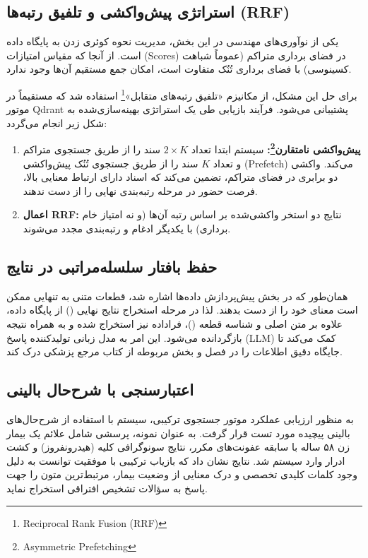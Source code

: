 \subsection{استراتژی پیش‌واکشی و تلفیق رتبه‌ها (RRF)}
یکی از نوآوری‌های مهندسی در این بخش، مدیریت نحوه کوئری زدن به پایگاه داده است. از آنجا که مقیاس امتیازات (Scores) در فضای برداری متراکم (عموماً شباهت کسینوسی) با فضای برداری تُنُک متفاوت است، امکان جمع مستقیم آن‌ها وجود ندارد. 

برای حل این مشکل، از مکانیزم «تلفیق رتبه‌های متقابل»\footnote{Reciprocal Rank Fusion (RRF)} استفاده شد که مستقیماً در موتور Qdrant پشتیبانی می‌شود. فرآیند بازیابی طی یک استراتژی بهینه‌سازی‌شده به شکل زیر انجام می‌گردد:
\begin{enumerate}
    \item \textbf{پیش‌واکشی نامتقارن\footnote{Asymmetric Prefetching}:} سیستم ابتدا تعداد $2 \times K$ سند را از طریق جستجوی متراکم و تعداد $K$ سند را از طریق جستجوی تُنُک پیش‌واکشی (Prefetch) می‌کند. واکشی دو برابری در فضای متراکم، تضمین می‌کند که اسناد دارای ارتباط معنایی بالا، فرصت حضور در مرحله رتبه‌بندی نهایی را از دست ندهند.
    \item \textbf{اعمال RRF:} نتایج دو استخر واکشی‌شده بر اساس رتبه آن‌ها (و نه امتیاز خام برداری) با یکدیگر ادغام و رتبه‌بندی مجدد می‌شوند.
\end{enumerate}

\subsection{حفظ بافتار سلسله‌مراتبی در نتایج}
همان‌طور که در بخش پیش‌پردازش داده‌ها اشاره شد، قطعات متنی به تنهایی ممکن است معنای خود را از دست بدهند. لذا در مرحله استخراج نتایج نهایی () از پایگاه داده، علاوه بر متن اصلی و شناسه قطعه ()، فراداده  نیز استخراج شده و به همراه نتیجه بازگردانده می‌شود. این امر به مدل زبانی تولیدکننده پاسخ (LLM) کمک می‌کند تا جایگاه دقیق اطلاعات را در فصل و بخش مربوطه از کتاب مرجع پزشکی درک کند.

\subsection{اعتبارسنجی با شرح‌حال بالینی}
به منظور ارزیابی عملکرد موتور جستجوی ترکیبی، سیستم با استفاده از شرح‌حال‌های بالینی پیچیده مورد تست قرار گرفت. به عنوان نمونه، پرسشی شامل علائم یک بیمار زن ۵۸ ساله با سابقه عفونت‌های مکرر، نتایج سونوگرافی کلیه (هیدرونفروز) و کشت ادرار وارد سیستم شد. نتایج نشان داد که بازیاب ترکیبی با موفقیت توانست به دلیل وجود کلمات کلیدی تخصصی و درک معنایی از وضعیت بیمار، مرتبط‌ترین متون را جهت پاسخ به سؤالات تشخیص افتراقی  استخراج نماید.

